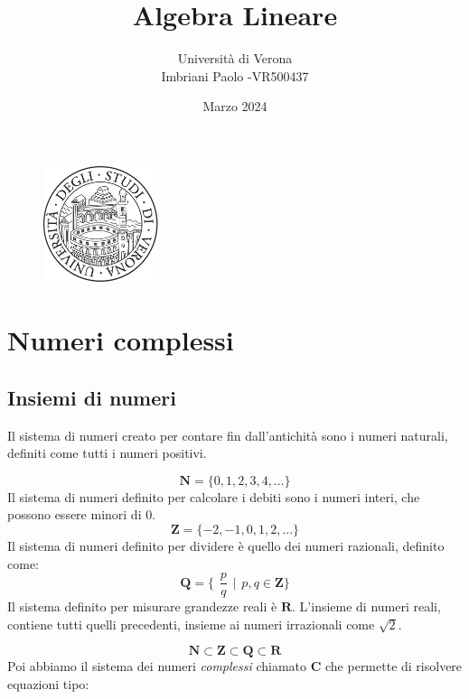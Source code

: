 \documentclass[12pt]{article}
\title{Algebra Lineare}
\author{Università di Verona\\Imbriani Paolo -VR500437}
\date{Marzo 2024}
\begin{document}
\begin{figure}
    \centering
    \includegraphics[width=0.3\textwidth]{UniversityofVerona.png}
    \label{fig:centered-image}
\end{figure}

\maketitle

\pagebreak

\tableofcontents

\pagebreak

\section{Numeri complessi}

\subsection{Insiemi di numeri}

Il sistema di numeri creato per contare fin dall'antichità sono i numeri naturali, definiti come tutti i numeri positivi.

\[\mathbf{N} = \{0, 1, 2, 3, 4, \ldots\}\]
Il sistema di numeri definito per calcolare i debiti sono i numeri interi, che possono essere minori di 0.
\[\mathbf{Z} = \{-2, -1, 0, 1, 2, \ldots\}\]
Il sistema di numeri definito per dividere è quello dei numeri razionali, definito come:
\[\mathbf{Q} = \{ \hspace{5pt} \frac{p}{q} \hspace{5pt} | \hspace{5pt} p, q \in \mathbf{Z}\}\]
Il sistema definito per misurare grandezze reali è $\mathbf{R}$. L'insieme di numeri reali, contiene tutti quelli precedenti, insieme ai numeri irrazionali come $\sqrt{2}$.

\[\mathbf{N} \subset \mathbf{Z} \subset \mathbf{Q} \subset \mathbf{R}\]
Poi abbiamo il sistema dei numeri \textit{complessi} chiamato $\mathbf{C}$ che permette di risolvere equazioni tipo:
\end{document}
